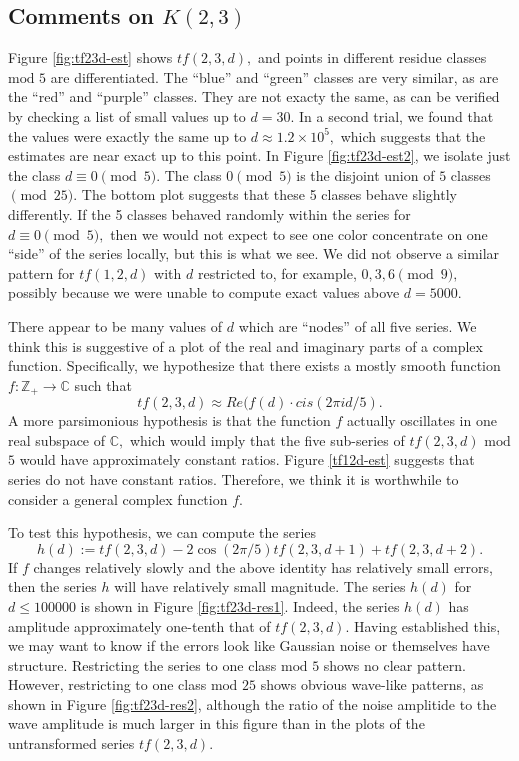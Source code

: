 \documentclass[11pt]{amsart} %
\begin{document}
\subsection{Comments on $K(2,3)$}
Figure \ref{fig:tf23d-est} shows $tf(2,3,d),$ and points in different residue classes $\text{mod }5$ are differentiated. The ``blue'' and ``green'' classes are very similar, as are the ``red'' and ``purple'' classes. They are not exacty the same, as can be verified by checking a list of small values up to $d = 30.$ In a second trial, we found that the values were exactly the same up to $d \approx 1.2 \times 10^5,$ which suggests that the estimates are near exact up to this point. In Figure \ref{fig:tf23d-est2}, we isolate just the class $d \equiv 0 \pmod{5}.$ The class $0 \pmod{5}$ is the disjoint union of $5$ classes $\pmod{25}.$ The bottom plot suggests that these 5 classes behave slightly differently. If the 5 classes behaved randomly within the series for $d \equiv 0 \pmod{5},$ then we would not expect to see one color concentrate on one ``side'' of the series locally, but this is what we see. We did not observe a similar pattern for $tf(1,2,d)$ with $d$ restricted to, for example, $0, 3, 6 \pmod{9},$ possibly because we were unable to compute exact values above $d = 5000.$

There appear to be many values of $d$ which are ``nodes'' of all five series. We think this is suggestive of a plot of the real and imaginary parts of a complex function. Specifically, we hypothesize that there exists a mostly smooth function $f: \mathbb{Z}_+ \rightarrow \mathbb{C}$ such that 
\[tf(2, 3, d) \approx Re(f(d) \cdot cis(2 \pi i d / 5).\]
A more parsimonious hypothesis is that the function $f$ actually oscillates in one real subspace of $\mathbb{C},$ which would imply that the five sub-series of $tf(2,3,d)$ $\text{mod}$ $5$ would have approximately constant ratios. Figure \ref{tf12d-est} suggests that series do not have constant ratios. Therefore, we think it is worthwhile to consider a general complex function $f.$

To test this hypothesis, we can compute the series
\[h(d) := tf(2,3,d) - 2 \cos(2 \pi/5) tf(2,3,d+1) + tf(2,3,d+2).\] If $f$ changes relatively slowly and the above identity has relatively small errors, then the series $h$ will have relatively small magnitude. The series $h(d)$ for $d \le 100000$ is shown in Figure \ref{fig:tf23d-res1}. Indeed, the series $h(d)$ has amplitude approximately one-tenth that of $tf(2,3,d).$ Having established this, we may want to know if the errors look like Gaussian noise or themselves have structure. Restricting the series to one class $\text{mod}$ $5$ shows no clear pattern. However, restricting to one class $\text{mod}$ $25$ shows obvious wave-like patterns, as shown in Figure \ref{fig:tf23d-res2}, although the ratio of the noise amplitide to the wave amplitude is much larger in this figure than in the plots of the untransformed series $tf(2,3,d).$ 
\end{document}
